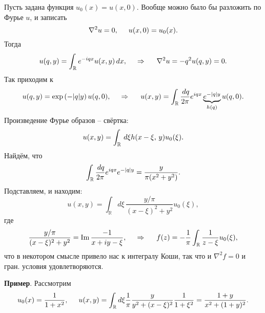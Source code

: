 Пусть задана функция $u_0 (x) = u(x, 0)$. Вообще можно было бы разложить по Фурье $u$, и записать
\begin{equation*}
    \nabla^2  u = 0,
    \hspace{5 mm}   
    u(x, 0) = u_0 (x).
\end{equation*}
Тогда
\begin{equation*}
    u(q, y)  = \int_{\mathbb{R}} e^{- i q x} u(x, y) \d x,
    \hspace{0.5cm} \Rightarrow \hspace{0.5cm}
    \nabla^2 u = - q^2 u(q, y) = 0.
\end{equation*}
Так приходим к
\begin{equation*}
    u(q, y) = \exp\left(- |q| y\right) u(q, 0),
    \hspace{0.5cm} \Rightarrow \hspace{0.5cm}   
    u(x, y) = \int_{\mathbb{R}} \frac{\d q}{2\pi} e^{i q x} \underbrace{e^{- |q| y}}_{h(q)} u(q, 0).
\end{equation*}
Произведение Фурье образов -- свёртка:
\begin{equation*}
    u(x, y) = \int_{\mathbb{R}} \d \xi h(x - \xi,\,  y) u_0 (\xi).
\end{equation*}
Найдём, что
\begin{equation*}
    \int_{\mathbb{R}} \frac{\d q}{2 \pi} e^{i q x} e^{-|q| y} = \frac{y}{\pi (x^2 + y^2)}.
\end{equation*}
Подставляем, и находим:
\begin{equation*}
    u(x, y) = \int_{\mathbb{R}} d \xi \, \frac{y/\pi}{(x-\xi)^2 + y^2} u_0 (\xi),
\end{equation*}
где 
\begin{equation*}
    \frac{y/\pi}{(x-\xi)^2 + y^2} = \Im \frac{-1}{x + i y - \xi},
    \hspace{0.5cm} \Rightarrow \hspace{0.5cm}   
    f(z) = - \frac{1}{\pi} \int_{\mathbb{R}} \frac{1}{z-\xi} u_0 (\xi),
\end{equation*}
что в некотором смысле привело нас к интегралу Коши, так что и $\nabla^2 f = 0$ и гран. условия удовлетворяются. 



\textbf{Пример}. Рассмотрим
\begin{equation*}
    u_0 (x) = \frac{1}{1 + x^2},
    \hspace{5 mm} 
    u(x, y) = \int_{\mathbb{R}} d \xi \frac{1}{\pi} \frac{y}{y^2 + (x-\xi)^2} \frac{1}{1+\xi^2} = \frac{1 + y}{x^2 + (1+y)^2}.
\end{equation*}

